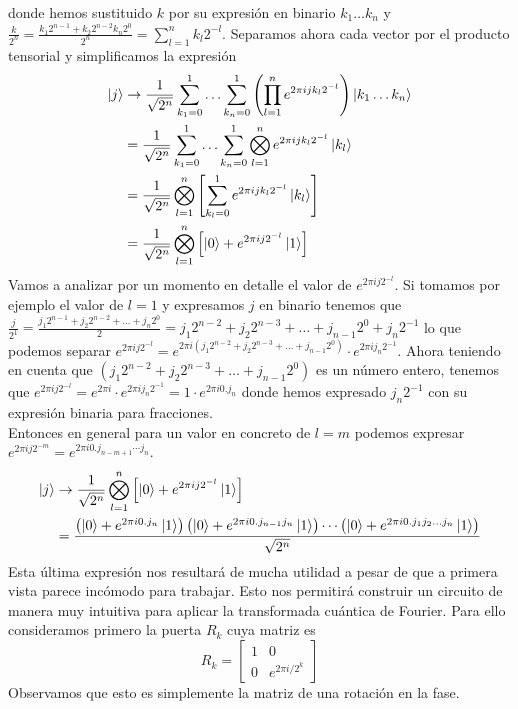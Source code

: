 \documentclass[a4paper]{article}
\numberwithin{equation}{section}
\begin{document}
donde hemos sustituido $k$ por su expresión en binario $k_1\ldots k_n$ y $\frac{k}{2^n} = \frac{k_1 2^{n-1} + k_2 2^{n-2} k_n 2^0}{2^n} = \sum_{l=1}^{n} k_l 2^{-l}$. Separamos ahora cada vector por el producto tensorial y simplificamos la expresión
\begin{equation}
\begin{split}
\ket{j} &\rightarrow
\frac{1}{\sqrt{2^n}} \sum_{k_1=0}^{1} \ldots \sum_{k_n=0}^{1} \left( \prod_{l=1}^{n} e^{2\pi i j k_l 2^{-l}} \right) \ket{k_1\ldots k_n}
\\ &=
\frac{1}{\sqrt{2^n}} \sum_{k_1=0}^{1} \ldots \sum_{k_n=0}^{1} \bigotimes_{l=1}^{n} e^{2\pi i j k_l 2^{-l}} \ket{k_l}
\\ &=
\frac{1}{\sqrt{2^n}} \bigotimes_{l=1}^{n} \left[ \sum_{k_l=0}^{1} e^{2\pi i j k_l 2^{-l}} \ket{k_l} \right]
\\ &=
\frac{1}{\sqrt{2^n}} \bigotimes_{l=1}^{n} \left[ \ket{0} + e^{2\pi i j 2^{-l}} \ket{1} \right]
\end{split}
\end{equation}
Vamos a analizar por un momento en detalle el valor de $e^{2\pi i j 2^{-l}}$. Si tomamos por ejemplo el valor de $l=1$ y expresamos $j$ en binario tenemos que $\frac{j}{2^1} = \frac{j_1 2^{n-1} + j_2 2^{n-2} + \ldots + j_n 2^{0}}{2} = j_1 2^{n-2} + j_2 2^{n-3} + \ldots + j_{n-1} 2^{0} + j_n 2^{-1}$ lo que podemos separar $e^{2\pi i j 2^{-l}} = e^{2\pi i \left( j_1 2^{n-2} + j_2 2^{n-3} + \ldots + j_{n-1} 2^{0} \right)} \cdot e^{2\pi i j_n 2^{-1}}$. Ahora teniendo en cuenta que $\left( j_1 2^{n-2} + j_2 2^{n-3} + \ldots + j_{n-1} 2^{0} \right)$ es un número entero, tenemos que $e^{2\pi i j 2^{-l}} = e^{2\pi i} \cdot e^{2\pi i j_n 2^{-1}} = 1 \cdot e^{2\pi i 0.j_n}$ donde hemos expresado $j_n 2^{-1}$ con su expresión binaria para fracciones.\\
Entonces en general para un valor en concreto de $l = m$ podemos expresar $e^{2\pi i j 2^{-m}} = e^{2\pi i 0.j_{n-m+1}\cdots j_{n}}$.
\begin{equation}
\begin{split}
\ket{j} &\rightarrow
\frac{1}{\sqrt{2^n}} \bigotimes_{l=1}^{n} \left[ \ket{0} + e^{2\pi i j 2^{-l}} \ket{1} \right]
\\ &=
\frac{\left( \ket{0} + e^{2\pi i 0.j_n}\ket{1} \right) \left( \ket{0} + e^{2\pi i 0.j_{n-1}j_n}\ket{1} \right) \cdots \left( \ket{0} + e^{2\pi i 0.j_1 j_2 \ldots j_n}\ket{1} \right)}{\sqrt{2^n}}
\end{split}
\end{equation}
Esta última expresión nos resultará de mucha utilidad a pesar de que a primera vista parece incómodo para trabajar. Esto nos permitirá construir un circuito de manera muy intuitiva para aplicar la transformada cuántica de Fourier. Para ello consideramos primero la puerta $R_k$ cuya matriz es
\begin{equation}
R_k =
\begin{bmatrix}
1 & 0 \\
0 & e^{2\pi i/2^k}
\end{bmatrix}
\end{equation}
Observamos que esto es simplemente la matriz de una rotación en la fase.
\end{document}

